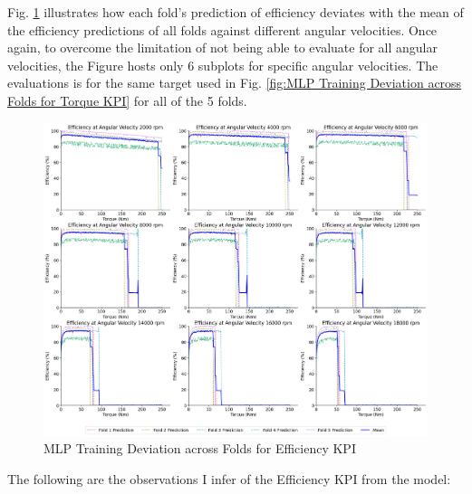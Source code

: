 \documentclass{report} %
\begin{document}
Fig. \ref{fig:MLP Training Deviation across Folds for Efficiency KPI} illustrates how each fold's prediction of efficiency deviates with the mean of the efficiency predictions 
of all folds against different angular velocities. Once again, to overcome the limitation of not being able to evaluate for all angular velocities, the Figure hosts only 6 
subplots for specific angular velocities. The evaluations is for the same target used in Fig. \ref{fig:MLP Training Deviation across Folds for Torque KPI} for all of the 5 folds.

\begin{figure}[H]
    \centering
    \includegraphics[width=1\textwidth]{./ReportImages/folds_dev_y2.png} 
    \caption{MLP Training Deviation across Folds for Efficiency \ac{KPI}} 
    \label{fig:MLP Training Deviation across Folds for Efficiency KPI}
\end{figure}

The following are the observations I infer of the Efficiency \ac{KPI} from the model:
\end{document}
